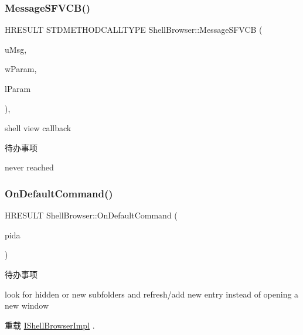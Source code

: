 \subsubsection{\texorpdfstring{Message\+S\+F\+V\+C\+B()}{MessageSFVCB()}}
{\footnotesize\ttfamily H\+R\+E\+S\+U\+LT S\+T\+D\+M\+E\+T\+H\+O\+D\+C\+A\+L\+L\+T\+Y\+PE Shell\+Browser\+::\+Message\+S\+F\+V\+CB (\begin{DoxyParamCaption}\item[{U\+I\+NT}]{u\+Msg,  }\item[{W\+P\+A\+R\+AM}]{w\+Param,  }\item[{L\+P\+A\+R\+AM}]{l\+Param }\end{DoxyParamCaption})\hspace{0.3cm}{\ttfamily [protected]}, {\ttfamily [virtual]}}



shell view callback 

\begin{DoxyRefDesc}{待办事项}
\item[\hyperlink{todo__todo000044}{待办事项}]never reached \end{DoxyRefDesc}
\mbox{\label{struct_shell_browser_a018b43673fbbf31294499cff061b61f3}} 
\subsubsection{\texorpdfstring{On\+Default\+Command()}{OnDefaultCommand()}}
{\footnotesize\ttfamily H\+R\+E\+S\+U\+LT Shell\+Browser\+::\+On\+Default\+Command (\begin{DoxyParamCaption}\item[{\hyperlink{struct_c_i_d_a}{L\+P\+I\+DA}}]{pida }\end{DoxyParamCaption})\hspace{0.3cm}{\ttfamily [virtual]}}

\begin{DoxyRefDesc}{待办事项}
\item[\hyperlink{todo__todo000045}{待办事项}]look for hidden or new subfolders and refresh/add new entry instead of opening a new window \end{DoxyRefDesc}


重载 \hyperlink{struct_i_shell_browser_impl}{I\+Shell\+Browser\+Impl} .

